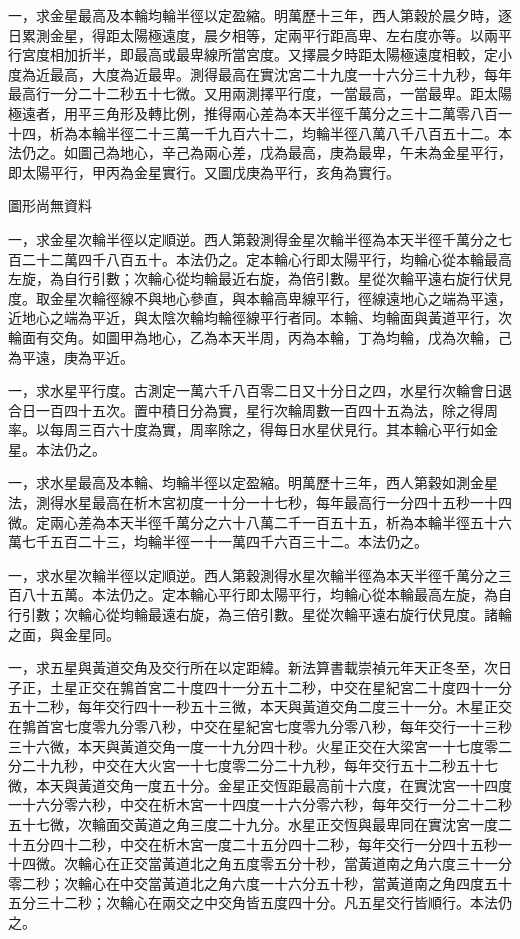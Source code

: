 \begin{pinyinscope}
一，求金星最高及本輪均輪半徑以定盈縮。明萬歷十三年，西人第穀於晨夕時，逐日累測金星，得距太陽極遠度，晨夕相等，定兩平行距高卑、左右度亦等。以兩平行宮度相加折半，即最高或最卑線所當宮度。又擇晨夕時距太陽極遠度相較，定小度為近最高，大度為近最卑。測得最高在實沈宮二十九度一十六分三十九秒，每年最高行一分二十二秒五十七微。又用兩測擇平行度，一當最高，一當最卑。距太陽極遠者，用平三角形及轉比例，推得兩心差為本天半徑千萬分之三十二萬零八百一十四，析為本輪半徑二十三萬一千九百六十二，均輪半徑八萬八千八百五十二。本法仍之。如圖己為地心，辛己為兩心差，戊為最高，庚為最卑，午未為金星平行，即太陽平行，甲丙為金星實行。又圖戊庚為平行，亥角為實行。

圖形尚無資料

一，求金星次輪半徑以定順逆。西人第穀測得金星次輪半徑為本天半徑千萬分之七百二十二萬四千八百五十。本法仍之。定本輪心行即太陽平行，均輪心從本輪最高左旋，為自行引數；次輪心從均輪最近右旋，為倍引數。星從次輪平遠右旋行伏見度。取金星次輪徑線不與地心參直，與本輪高卑線平行，徑線遠地心之端為平遠，近地心之端為平近，與太陰次輪均輪徑線平行者同。本輪、均輪面與黃道平行，次輪面有交角。如圖甲為地心，乙為本天半周，丙為本輪，丁為均輪，戊為次輪，己為平遠，庚為平近。

一，求水星平行度。古測定一萬六千八百零二日又十分日之四，水星行次輪會日退合日一百四十五次。置中積日分為實，星行次輪周數一百四十五為法，除之得周率。以每周三百六十度為實，周率除之，得每日水星伏見行。其本輪心平行如金星。本法仍之。

一，求水星最高及本輪、均輪半徑以定盈縮。明萬歷十三年，西人第穀如測金星法，測得水星最高在析木宮初度一十分一十七秒，每年最高行一分四十五秒一十四微。定兩心差為本天半徑千萬分之六十八萬二千一百五十五，析為本輪半徑五十六萬七千五百二十三，均輪半徑一十一萬四千六百三十二。本法仍之。

一，求水星次輪半徑以定順逆。西人第穀測得水星次輪半徑為本天半徑千萬分之三百八十五萬。本法仍之。定本輪心平行即太陽平行，均輪心從本輪最高左旋，為自行引數；次輪心從均輪最遠右旋，為三倍引數。星從次輪平遠右旋行伏見度。諸輪之面，與金星同。

一，求五星與黃道交角及交行所在以定距緯。新法算書載崇禎元年天正冬至，次日子正，土星正交在鶉首宮二十度四十一分五十二秒，中交在星紀宮二十度四十一分五十二秒，每年交行四十一秒五十三微，本天與黃道交角二度三十一分。木星正交在鶉首宮七度零九分零八秒，中交在星紀宮七度零九分零八秒，每年交行一十三秒三十六微，本天與黃道交角一度一十九分四十秒。火星正交在大梁宮一十七度零二分二十九秒，中交在大火宮一十七度零二分二十九秒，每年交行五十二秒五十七微，本天與黃道交角一度五十分。金星正交恆距最高前十六度，在實沈宮一十四度一十六分零六秒，中交在析木宮一十四度一十六分零六秒，每年交行一分二十二秒五十七微，次輪面交黃道之角三度二十九分。水星正交恆與最卑同在實沈宮一度二十五分四十二秒，中交在析木宮一度二十五分四十二秒，每年交行一分四十五秒一十四微。次輪心在正交當黃道北之角五度零五分十秒，當黃道南之角六度三十一分零二秒；次輪心在中交當黃道北之角六度一十六分五十秒，當黃道南之角四度五十五分三十二秒；次輪心在兩交之中交角皆五度四十分。凡五星交行皆順行。本法仍之。


\end{pinyinscope}

